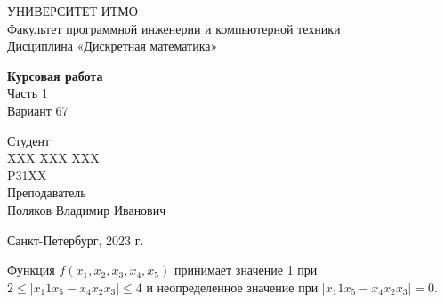 \documentclass{article}
\begin{document}
\begin{center}
    УНИВЕРСИТЕТ ИТМО \\
    Факультет программной инженерии и компьютерной техники \\
    Дисциплина «Дискретная математика»
    
    \vspace{5cm}

    \large
    \textbf{Курсовая работа} \\
    Часть 1 \\
    Вариант 67
\end{center}

\vspace{2cm}

\hfill\begin{minipage}{0.35\linewidth}
Студент \\
XXX XXX XXX \\
P31XX \\

Преподаватель \\
Поляков Владимир Иванович
\end{minipage}

\vfill

\begin{center}
    Санкт-Петербург, 2023 г.
\end{center}

\thispagestyle{empty}
\newpage

Функция $f(x_1, x_2, x_3, x_4, x_5)$ принимает значение 1 при $2 \le |x_1 1 x_5 - x_4 x_2 x_3| \le 4$ и неопределенное значение при $|x_1 1 x_5 - x_4 x_2 x_3| = 0$.
\end{document}
